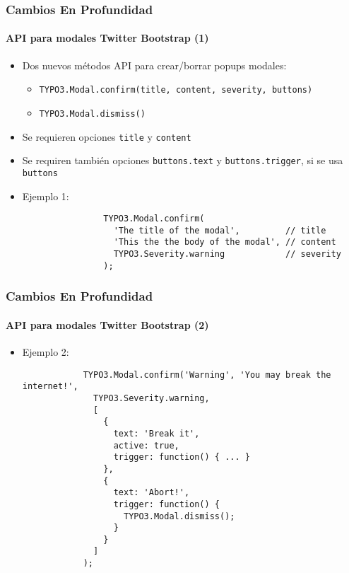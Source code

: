 \begin{frame}[fragile]
	\frametitle{Cambios En Profundidad}
	\framesubtitle{API para modales Twitter Bootstrap (1)}

	\lstset{basicstyle=\smaller\ttfamily}

	\begin{itemize}

		\item Dos nuevos métodos API para crear/borrar popups modales:
			\begin{itemize}
				\item \texttt{TYPO3.Modal.confirm(title, content, severity, buttons)}
				\item \texttt{TYPO3.Modal.dismiss()}
			\end{itemize}

		\item Se requieren opciones \texttt{title} y \texttt{content}
		\item Se requiren también opciones \texttt{buttons.text} y \texttt{buttons.trigger}, si se usa \texttt{buttons}

		\item Ejemplo 1:

			\begin{lstlisting}
				TYPO3.Modal.confirm(
				  'The title of the modal',         // title
				  'This the the body of the modal', // content
				  TYPO3.Severity.warning            // severity
				);
			\end{lstlisting}

	\end{itemize}

\end{frame}


\begin{frame}[fragile]
	\frametitle{Cambios En Profundidad}
	\framesubtitle{API para modales Twitter Bootstrap (2)}

	\begin{itemize}

		\item Ejemplo 2:

		\begin{lstlisting}
			TYPO3.Modal.confirm('Warning', 'You may break the internet!',
			  TYPO3.Severity.warning,
			  [
			    {
			      text: 'Break it',
			      active: true,
			      trigger: function() { ... }
			    },
			    {
			      text: 'Abort!',
			      trigger: function() {
			        TYPO3.Modal.dismiss();
			      }
			    }
			  ]
			);
		\end{lstlisting}

	\end{itemize}

\end{frame}

